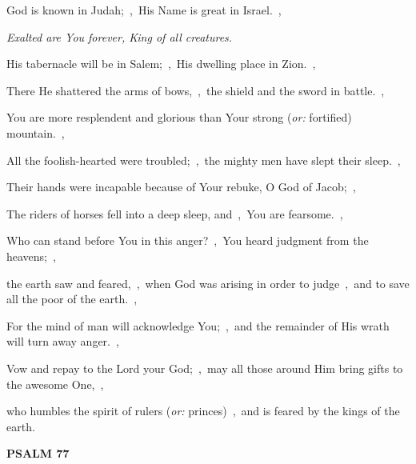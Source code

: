 \documentclass[12pt,twoside,a5paper]{article}
\newcommand{\psalm}[1]{\textbf{PSALM {#1}}\nopagebreak}
\newcommand{\qanona}[1]{{\liturgicalhint{Qanona.} \emph{#1}}}
\newcommand{\translationoption}[1]{\emph{or:} #1}
\begin{document}
\begin{normalparskip}
  God is known in Judah;~\sep\ His Name is great in Israel.~\sep

  \qanona{Exalted are You forever, King of all creatures.}

  His tabernacle will be in Salem;~\sep\ His dwelling place in Zion.~\sep

  There He shattered the arms of bows,~\sep\ the shield and the sword in battle.~\sep

  You are more resplendent and glorious than Your strong (\translationoption{fortified}) mountain.~\sep

  All the foolish-hearted were troubled;~\sep\ the mighty men have slept their sleep.~\sep

  Their hands were incapable because of Your rebuke, O God of Jacob;~\sep

  The riders of horses fell into a deep sleep, and~\sep\ You are fearsome.~\sep

  Who can stand before You in this anger?~\sep\ You heard judgment from the heavens;~\sep

  the earth saw and feared,~\sep\ when God was arising in order to judge~\sep\ and to save all the poor of the earth.~\sep

  For the mind of man will acknowledge You;~\sep\ and the remainder of His wrath will turn away anger.~\sep

  Vow and repay to the Lord your God;~\sep\ may all those around Him bring gifts to the awesome One,~\sep

  who humbles the spirit of rulers (\translationoption{princes})~\sep\ and is feared by the kings of the earth.
\end{normalparskip}

\psalm{77}
\end{document}
